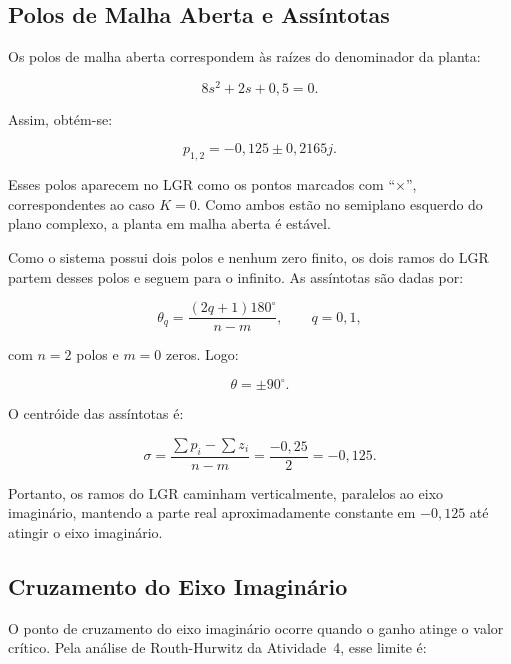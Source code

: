 \documentclass[12pt,a4paper]{article}
\begin{document}
\subsection{Polos de Malha Aberta e Assíntotas}

Os polos de malha aberta correspondem às raízes do denominador da planta:

\begin{equation}
  8s^2+2s+0{,}5=0.
\end{equation}

Assim, obtém-se:

\begin{equation}
  p_{1,2}=-0{,}125\pm0{,}2165j.
\end{equation}

Esses polos aparecem no LGR como os pontos marcados com ``$\times$'', correspondentes ao caso $K=0$. Como ambos estão no semiplano esquerdo do plano complexo, a planta em malha aberta é estável.

Como o sistema possui dois polos e nenhum zero finito, os dois ramos do LGR partem desses polos e seguem para o infinito. As assíntotas são dadas por:

\begin{equation}
  \theta_q=\frac{(2q+1)180^\circ}{n-m}, \qquad q=0,1,
\end{equation}

com $n=2$ polos e $m=0$ zeros. Logo:

\begin{equation}
  \theta=\pm90^\circ.
\end{equation}

O centróide das assíntotas é:

\begin{equation}
  \sigma=\frac{\sum p_i-\sum z_i}{n-m}=\frac{-0{,}25}{2}=-0{,}125.
\end{equation}

Portanto, os ramos do LGR caminham verticalmente, paralelos ao eixo imaginário, mantendo a parte real aproximadamente constante em $-0{,}125$ até atingir o eixo imaginário.

\subsection{Cruzamento do Eixo Imaginário}

O ponto de cruzamento do eixo imaginário ocorre quando o ganho atinge o valor crítico. Pela análise de Routh-Hurwitz da Atividade~4, esse limite é:
\end{document}
